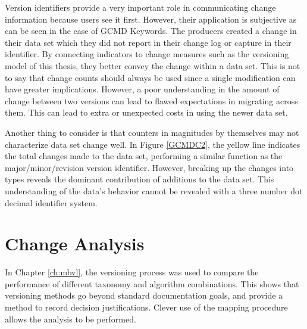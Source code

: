 Version identifiers provide a very important role in communicating change information because users see it first.
However, their application is subjective as can be seen in the case of GCMD Keywords.
The producers created a change in their data set which they did not report in their change log or capture in their identifier.
By connecting indicators to change measures such as the versioning model of this thesis, they better convey the change within a data set.
This is not to say that change counts should always be used since a single modification can have greater implications.
However, a poor understanding in the amount of change between two versions can lead to flawed expectations in migrating across them.
This can lead to extra or unexpected costs in using the newer data set.

Another thing to consider is that counters in magnitudes by themselves may not characterize data set change well.
In Figure \ref{GCMDC2}, the yellow line indicates the total changes made to the data set, performing a similar function as the major/minor/revision version identifier.
However, breaking up the changes into types reveals the dominant contribution of additions to the data set.
This understanding of the data's behavior cannot be revealed with a three number dot decimal identifier system.

\section{Change Analysis}

In Chapter \ref{ch:mbvl}, the versioning process was used to compare the performance of different taxonomy and algorithm combinations.
This shows that versioning methods go beyond standard documentation goals, and provide a method to record decision justifications.
Clever use of the mapping procedure allows the analysis to be performed.